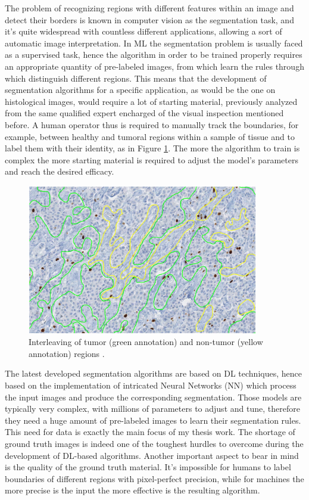 The problem of recognizing regions with different features within an image and detect their borders is known in computer vision as the segmentation task, and it's quite widespread with countless different applications, allowing a sort of automatic image interpretation. In ML the segmentation problem is usually faced as a supervised task, hence the algorithm in order to be trained properly requires an appropriate quantity of pre-labeled images, from which learn the rules through which distinguish different regions. This means that the development of segmentation algorithms for a specific application, as would be the one on histological images, would require a lot of starting material, previously analyzed from the same qualified expert encharged of the visual inspection mentioned before. A human operator thus is required to manually track the boundaries, for example, between healthy and tumoral regions within a sample of tissue and to label them with their identity, as in Figure \ref{fig:man_seg}. The more the algorithm to train is complex the more starting material is required to adjust the model's parameters and reach the desired efficacy.

\begin{figure}
    \centering
    \includegraphics[width = 0.9\textwidth]{images/manual_seg}
    \caption{Interleaving of tumor (green annotation) and non-tumor (yellow annotation) regions \cite{Ki67}.}
    \label{fig:man_seg}
\end{figure}


The latest developed segmentation algorithms are based on DL techniques, hence based on the implementation of intricated Neural Networks (NN) which process the input images and produce the corresponding segmentation. Those models are typically very complex, with millions of parameters to adjust and tune, therefore they need a huge amount of pre-labeled images to learn their segmentation rules. This need for data is exactly the main focus of my thesis work. The shortage of ground truth images is indeed one of the toughest hurdles to overcome during the development of DL-based algorithms. Another important aspect to bear in mind is the quality of the ground truth material. It's impossible for humans to label boundaries of different regions with pixel-perfect precision, while for machines the more precise is the input the more effective is the resulting algorithm.


